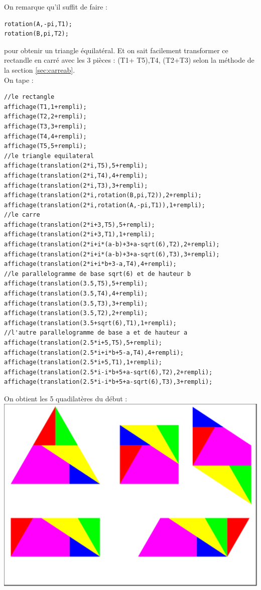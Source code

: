 \documentclass[a4paper,11pt]{book}
\begin{document}
On remarque qu'il suffit de faire :\\
\begin{verbatim}
rotation(A,-pi,T1);
rotation(B,pi,T2);
\end{verbatim}
pour obtenir un triangle \'equilat\'eral.
Et on sait facilement transformer ce rectandle en carr\'e avec 
les 3 pi\`eces : (T1+ T5),T4, (T2+T3) selon la m\'ethode 
de la section \ref{sec:carreab}.\\
On tape :
\begin{verbatim}
//le rectangle
affichage(T1,1+rempli);
affichage(T2,2+rempli);
affichage(T3,3+rempli);
affichage(T4,4+rempli);
affichage(T5,5+rempli);
//le triangle equilateral
affichage(translation(2*i,T5),5+rempli);
affichage(translation(2*i,T4),4+rempli);
affichage(translation(2*i,T3),3+rempli);
affichage(translation(2*i,rotation(B,pi,T2)),2+rempli);
affichage(translation(2*i,rotation(A,-pi,T1)),1+rempli);
//le carre
affichage(translation(2*i+3,T5),5+rempli);
affichage(translation(2*i+3,T1),1+rempli);
affichage(translation(2*i+i*(a-b)+3+a-sqrt(6),T2),2+rempli);
affichage(translation(2*i+i*(a-b)+3+a-sqrt(6),T3),3+rempli);
affichage(translation(2*i+i*b+3-a,T4),4+rempli);
//le parallelogramme de base sqrt(6) et de hauteur b
affichage(translation(3.5,T5),5+rempli);
affichage(translation(3.5,T4),4+rempli);
affichage(translation(3.5,T3),3+rempli);
affichage(translation(3.5,T2),2+rempli);
affichage(translation(3.5+sqrt(6),T1),1+rempli);
//l'autre parallelogramme de base a et de hauteur a
affichage(translation(2.5*i+5,T5),5+rempli);
affichage(translation(2.5*i+i*b+5-a,T4),4+rempli);
affichage(translation(2.5*i+5,T1),1+rempli);
affichage(translation(2.5*i-i*b+5+a-sqrt(6),T2),2+rempli);
affichage(translation(2.5*i-i*b+5+a-sqrt(6),T3),3+rempli);
\end{verbatim}
On obtient les 5 quadilat\`eres du d\'ebut :\\
\includegraphics[width=\textwidth]{puzzlecatri5}\\
\end{document}
